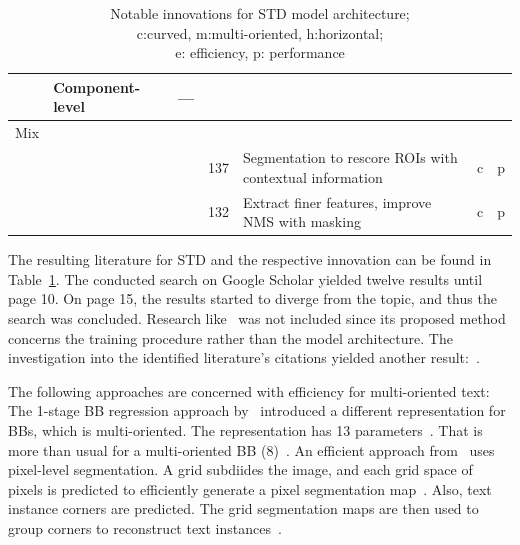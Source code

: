 \begin{table}[ht]
\begin{tabular}{p{}p{}p{}p{}
            p{}p{}p{}}
            & Component-level &~--- & & \\
        \midrule
        Mix & & \\
            & &~\cite{xie_scene_2018} & 137 & Segmentation to rescore \acp{ROI} with
                contextual information & c & p \\
            & &~\cite{dai_fused_2018} & 132 & Extract finer features, improve \ac{NMS} with masking
            & c & p \\
        \bottomrule
    \end{tabular}
    \captionsetup{justification=centering}
    \caption[Notable innovations for STD model architecture]{%
        Notable innovations for STD model architecture; \\
        c:curved, m:multi-oriented, h:horizontal; \\
        e: efficiency, p: performance\label{tb:STD-steps-properties}
    }
\end{table}
The resulting literature for \ac{STD} and the respective innovation can be found in
Table~\ref{tb:STD-steps-properties}.
The conducted search on Google Scholar yielded twelve results until page 10.
On page 15, the results started to diverge from the topic, and thus the search was concluded.
Research like~\cite{xue_accurate_2018} was not included since its proposed method concerns the
training procedure rather than the model architecture.
The investigation into the identified literature's citations yielded another
result:~\cite{ferrari_textsnake_2018}.

The following approaches are concerned with efficiency for multi-oriented text:
The 1-stage \ac{BB} regression approach by~\citep{liao_textboxes_2018} introduced a different
representation for \acp{BB}, which is multi-oriented.
The representation has 13 parameters~\citep{liao_textboxes_2018}.
That is more than usual for a multi-oriented \ac{BB} (8)~\citep{ma_arbitrary-oriented_2018}.
An efficient approach from~\cite{lyu_multi-oriented_2018} uses pixel-level segmentation.
A grid subdiides the image, and each grid space of pixels is
predicted to efficiently generate a pixel segmentation map~\citep{lyu_multi-oriented_2018}.
Also, text instance corners are predicted.
The grid segmentation maps are then used to group corners to reconstruct text
instances~\citep{lyu_multi-oriented_2018}.

